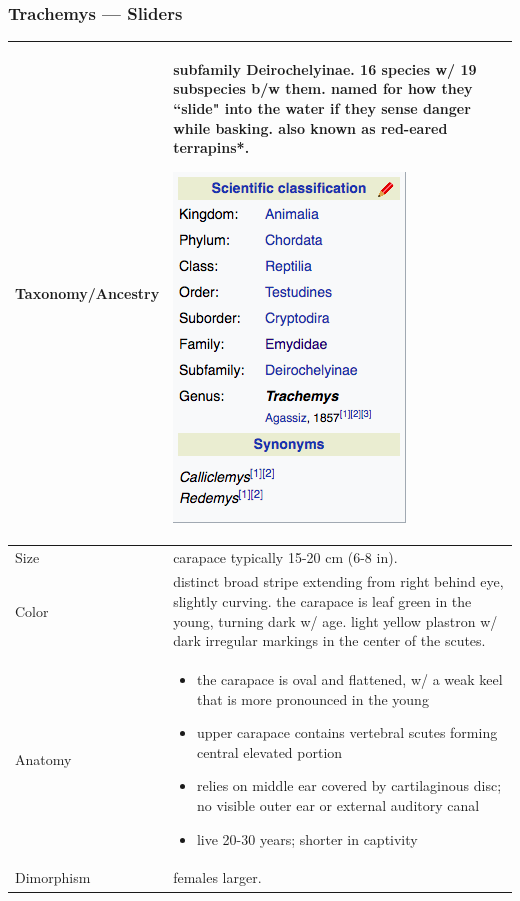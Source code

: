 \subsubsection{Trachemys --- Sliders}
\begin{center}
\begin{longtabu} to 

	\hline
	Taxonomy/Ancestry &
	subfamily Deirochelyinae. 16 species w/ 19 subspecies b/w them. named for how they ``slide" into the water if they sense danger while basking. also known as red-eared terrapins*.
	
	\begin{center} \includegraphics[scale=0.5]{testudines/emydidae/trachemys/tax} \end{center}
	 \\
	\hline
	Size & 
	carapace typically 15-20 cm (6-8 in).
	\\
	\hline
	Color &
	distinct broad stripe extending from right behind eye, slightly curving. the carapace is leaf green in the young, turning dark w/ age. light yellow plastron w/ dark irregular markings in the center of the scutes.
	 \\
	\hline
	Anatomy &
	\begin{itemize}[noitemsep]
		\item the carapace is oval and flattened, w/ a weak keel that is more pronounced in the young
		\item upper carapace contains vertebral scutes forming central elevated portion
		\item relies on middle ear covered by cartilaginous disc; no visible outer ear or external auditory canal
		\item live 20-30 years; shorter in captivity
	\end{itemize}
	 \\
	\hline
	Dimorphism & 
	females larger.
	

\end{longtabu}
\end{center}
